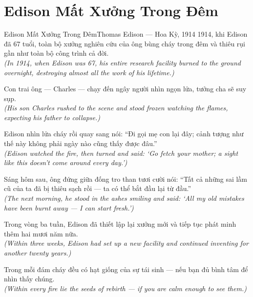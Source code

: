 \section{Edison Mất Xưởng Trong Đêm}
\begin{truyen}{Edison Mất Xưởng Trong Đêm}{Thomas Edison --- Hoa Kỳ, 1914}
 1914, khi Edison đã 67 tuổi, toàn bộ xưởng nghiên cứu của ông bùng cháy trong đêm và thiêu rụi gần như toàn bộ công trình cả đời.\\[4pt]
\textit{(In 1914, when Edison was 67, his entire research facility burned to the ground overnight, destroying almost all the work of his lifetime.)}

Con trai ông --- Charles --- chạy đến ngây người nhìn ngọn lửa, tưởng cha sẽ suy sụp.\\[4pt]
\textit{(His son Charles rushed to the scene and stood frozen watching the flames, expecting his father to collapse.)}

Edison nhìn lửa cháy rồi quay sang nói: ``Đi gọi mẹ con lại đây; cảnh tượng như thế này không phải ngày nào cũng thấy được đâu.''\\[4pt]
\textit{(Edison watched the fire, then turned and said: `Go fetch your mother; a sight like this doesn't come around every day.')}

Sáng hôm sau, ông đứng giữa đống tro than tươi cười nói: ``Tất cả những sai lầm cũ của ta đã bị thiêu sạch rồi --- ta có thể bắt đầu lại từ đầu.''\\[4pt]
\textit{(The next morning, he stood in the ashes smiling and said: `All my old mistakes have been burnt away --- I can start fresh.')}

Trong vòng ba tuần, Edison đã thiết lập lại xưởng mới và tiếp tục phát minh thêm hai mươi năm nữa.\\[4pt]
\textit{(Within three weeks, Edison had set up a new facility and continued inventing for another twenty years.)}

\end{truyen}
\begin{baihoc}
  Trong mỗi đám cháy đều có hạt giống của sự tái sinh --- nếu bạn đủ bình tâm để nhìn thấy chúng.\\[4pt]
  \textit{(Within every fire lie the seeds of rebirth --- if you are calm enough to see them.)}
\end{baihoc}

